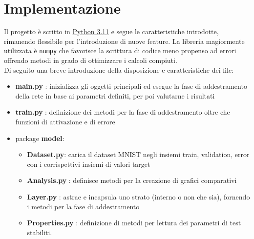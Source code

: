 \chapter{Implementazione}
Il progetto è scritto in \href{https://www.python.org/downloads/release/python-3110/}{Python 3.11} e segue le caratteristiche introdotte, rimanendo flessibile per l'introduzione di nuove feature. La libreria magiormente utilizzata è \texttt{numpy} che favorisce la scrittura di codice meno propenso ad errori offrendo metodi in grado di ottimizzare i calcoli compiuti. \\
Di seguito una breve introduzione della disposizione e caratteristiche dei file:
\begin{itemize}
    \item \textbf{main.py} : inizializza gli oggetti principali ed esegue la fase di addestramento della rete in base ai parametri definiti, per poi valutarne i risultati
    \item \textbf{train.py} : definizione dei metodi per la fase di addestramento oltre che funzioni di attivazione e di errore
    \item package \textbf{model}:
    \begin{itemize}
        \item \textbf{Dataset.py}: carica il dataset MNIST negli insiemi train, validation, error con i corrispettivi insiemi di valori target 
        \item \textbf{Analysis.py} : definisce metodi per la creazione di grafici comparativi
        \item \textbf{Layer.py} : astrae e incapsula uno strato (interno o non che sia), fornendo i metodi per la fase di addestramento
        \item \textbf{Properties.py} : definizione di metodi per lettura dei parametri di test stabiliti.
    \end{itemize}
\end{itemize}

